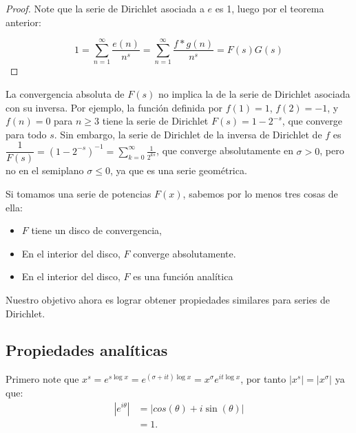 \begin{proof}
Note que la serie de Dirichlet asociada a $e$ es 1, luego por el teorema anterior:

$$1=\sum_{n=1}^{\infty} \frac{e(n)}{n^s}=\sum_{n=1}^{\infty} \frac{f*g(n)}{n^s}=F(s)G(s)$$
\end{proof}

\begin{note}
La convergencia absoluta de \( F(s) \) no implica la de la serie de Dirichlet asociada con su inversa. Por ejemplo, la función definida por \( f(1)=1 \), \( f(2)=-1 \), y \( f(n)=0 \) para \( n \geq 3 \) tiene la serie de Dirichlet \( F(s)=1-2^{-s} \), que converge para todo $s$. Sin embargo, la serie de Dirichlet de la inversa de Dirichlet de \( f \) es \( \dfrac{1}{F(s)} = (1-2^{-s})^{-1} = \displaystyle\sum_{k=0}^{\infty} \frac{1}{2^{ks}} \), que converge absolutamente en \( \sigma > 0 \), pero no en el semiplano \( \sigma \leq 0 \), ya que es una serie geométrica. \cite{hildebrand2006introduction}
\end{note}

Si tomamos una serie de potencias $F(x)$, sabemos por lo menos tres cosas de ella:

\begin{itemize}[label=$\bullet$]
    \item $F$ tiene un disco de convergencia, 

    \item En el interior del disco, $F$ converge absolutamente.

    \item En el interior del disco, $F$ es una función analítica \cite{Apostol:105425}
\end{itemize}

Nuestro objetivo ahora es lograr obtener propiedades similares para series de Dirichlet.
\subsection{Propiedades analíticas}

Primero note que $\displaystyle x^{\displaystyle  s}=e^{\displaystyle s\log x}=e^{\displaystyle(\sigma+it)\log x}=x^{\displaystyle\sigma}e^{\displaystyle it\log{x}}$, por tanto $|\displaystyle x^{\displaystyle s}|=|x^{\displaystyle\sigma}|$ ya que:
\begin{align*}
     \left|e^{ i\theta}\right|&=|cos(\theta)+i\sin(\theta)|\\
     &=1
 .\end{align*} 


